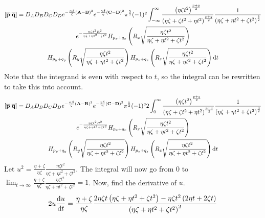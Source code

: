 \begin{multline}
  \left[\overline{\mathbf{p}}\middle|\overline{\mathbf{q}}\right] = D_A D_B D_C D_D e^{-\frac{\alpha\beta}{\zeta}\left(\mathbf{A} - \mathbf{B}\right)^2}e^{-\frac{\gamma\delta}{\eta}\left(\mathbf{C} - \mathbf{D}\right)^2}\pi^{\frac{5}{2}} (-1)^{q} \int_{-\infty}^\infty \frac{\left(\eta\zeta t^2\right)^{\frac{p + q}{2}}}{\left(\eta\zeta + \zeta t^2 + \eta t^2\right)^{\frac{p + q}{2}}}\frac{1}{\left(\eta \zeta + \eta t^2 + \zeta t^2\right)^{\frac{3}{2}}} \\
  e^{-\frac{\eta\zeta t^2 R^2}{\eta\zeta + \eta t^2 + \zeta t^2}} H_{p_x + q_x}\left(R_x\sqrt{\frac{\eta\zeta t^2}{\eta\zeta + \eta t^2 + \zeta t^2}}\right)\\
  H_{p_y + q_y}\left(R_y\sqrt{\frac{\eta\zeta t^2}{\eta\zeta + \eta t^2 + \zeta t^2}}\right)H_{p_z + q_z}\left(R_z\sqrt{\frac{\eta\zeta t^2}{\eta\zeta + \eta t^2 + \zeta t^2}}\right) \mathrm{d} t
\end{multline}
Note that the integrand is even with respect to $t$, so the integral can be rewritten to take this into account.
\begin{multline}
  \left[\overline{\mathbf{p}}\middle|\overline{\mathbf{q}}\right] = D_A D_B D_C D_D e^{-\frac{\alpha\beta}{\zeta}\left(\mathbf{A} - \mathbf{B}\right)^2}e^{-\frac{\gamma\delta}{\eta}\left(\mathbf{C} - \mathbf{D}\right)^2}\pi^{\frac{5}{2}} (-1)^{q} 2\int_{0}^\infty \frac{\left(\eta\zeta t^2\right)^{\frac{p + q}{2}}}{\left(\eta\zeta + \zeta t^2 + \eta t^2\right)^{\frac{p + q}{2}}}\frac{1}{\left(\eta \zeta + \eta t^2 + \zeta t^2\right)^{\frac{3}{2}}} \\
  e^{-\frac{\eta\zeta t^2 R^2}{\eta\zeta + \eta t^2 + \zeta t^2}} H_{p_x + q_x}\left(R_x\sqrt{\frac{\eta\zeta t^2}{\eta\zeta + \eta t^2 + \zeta t^2}}\right)\\
  H_{p_y + q_y}\left(R_y\sqrt{\frac{\eta\zeta t^2}{\eta\zeta + \eta t^2 + \zeta t^2}}\right)H_{p_z + q_z}\left(R_z\sqrt{\frac{\eta\zeta t^2}{\eta\zeta + \eta t^2 + \zeta t^2}}\right) \mathrm{d} t
\end{multline}
Let $u^2 = \frac{\eta + \zeta}{\eta\zeta}\frac{\eta\zeta t^2}{\eta\zeta + \eta t^2 + \zeta t^2}$. The integral will now go from $0$ to $\lim_{t\rightarrow \infty} \frac{\eta + \zeta}{\eta\zeta}\frac{\eta\zeta t^2}{\eta\zeta + \eta t^2 + \zeta t^2} = 1$. Now, find the derivative of $u$.
\begin{equation}
  2u\frac{\mathrm{d} u}{\mathrm{d} t} = \frac{\eta + \zeta}{\eta\zeta} \frac{2\eta\zeta t \left(\eta\zeta + \eta t^2 + \zeta t^2\right) - \eta\zeta t^2 \left(2\eta t + 2\zeta t\right)}{\left(\eta\zeta + \eta t^2 + \zeta t^2\right)^2}
\end{equation}
